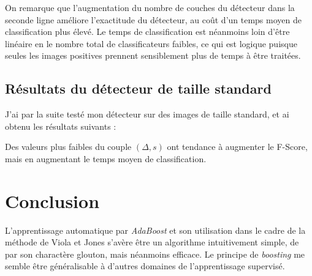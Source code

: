 \documentclass[12pt,a4paper]{article}
\begin{document}
On remarque que l'augmentation du nombre de couches du détecteur dans la seconde ligne améliore l'exactitude du détecteur, au coût d'un temps moyen de classification plus élevé. Le temps de classification est néanmoins loin d'être linéaire en le nombre total de classificateurs faibles, ce qui est logique puisque seules les images positives prennent sensiblement plus de temps à être traitées.

\subsection{Résultats du détecteur de taille standard}
\label{sec:results-standard}
J'ai par la suite testé mon détecteur sur des images de taille standard, et ai obtenu les résultats suivants :
\renewcommand{\arraystretch}{1.3}
\begin{table}[h]
    
\end{table}

Des valeurs plus faibles du couple $(\Delta, s)$ ont tendance à augmenter le F-Score, mais en augmentant le temps moyen de classification.

\section{Conclusion}
L'apprentissage automatique par \textit{AdaBoost} et son utilisation dans le cadre de la méthode de Viola et Jones s'avère être un algorithme intuitivement simple, de par son charactère glouton, mais néanmoins efficace. Le principe de \textit{boosting} me semble être généralisable à d'autres domaines de l'apprentissage supervisé.
\end{document}
